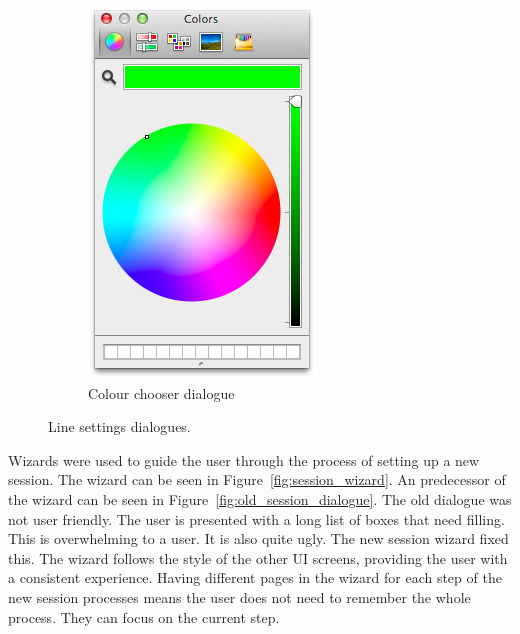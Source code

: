 \begin{figure}[h!]
\begin{subfigure}[b]{0.3\textwidth}
        \includegraphics[width=\textwidth]{images/colour_selector.png}
        \caption{Colour chooser dialogue}
        \label{fig:colour_picker}
    \end{subfigure}
    \caption{Line settings dialogues.}
    \label{fig:line_settings}
\end{figure}

Wizards were used to guide the user through the process of setting up a new session.  The wizard can be seen in Figure~\ref{fig:session_wizard}.  An predecessor of the wizard can be seen in Figure~\ref{fig:old_session_dialogue}.  The old dialogue was not user friendly.  The user is presented with a long list of boxes that need filling.  This is overwhelming to a user.  It is also quite ugly.  The new session wizard fixed this.  The wizard follows the style of the other \ac{UI} screens, providing the user with a consistent experience.  Having different pages in the wizard for each step of the new session processes means the user does not need to remember the whole process.  They can focus on the current step.

